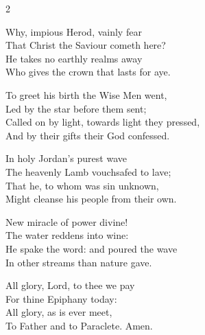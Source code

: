 \begin{multicols}{2}
\begin{enpars}\raggedcolumns
Why, impious Herod, vainly fear\\
That Christ the Saviour cometh here?\\
He takes no earthly realms away\\
Who gives the crown that lasts for aye.

To greet his birth the Wise Men went,\\
Led by the star before them sent;\\
Called on by light, towards light they pressed,\\
And by their gifts their God confessed.

In holy Jordan's purest wave\\
The heavenly Lamb vouchsafed to lave;\\
That he, to whom was sin unknown,\\
Might cleanse his people from their own.

New miracle of power divine!\\
The water reddens into wine:\\
He spake the word: and poured the wave\\
In other streams than nature gave.

All glory, Lord, to thee we pay\\
For thine Epiphany today:\\
All glory, as is ever meet,\\
To Father and to Paraclete. Amen.
\end{enpars}\end{multicols}
